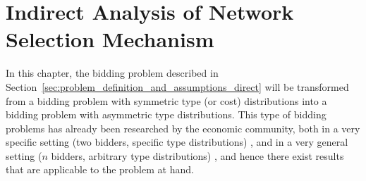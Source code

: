 \chapter{Indirect Analysis of Network Selection Mechanism}
\label{cha:indirect}

\minitoc
\vspace{10mm}

In this chapter, the bidding problem described in Section~\ref{sec:problem_definition_and_assumptions_direct} will be transformed from a bidding problem with symmetric type (or cost) distributions into a bidding problem with asymmetric type distributions. This type of bidding problems has already been researched by the economic community, both in a very specific setting (two bidders, specific type distributions) \cite{KaplanZamir2007,MaskinRiley2000}, and in a very general setting ($n$ bidders, arbitrary type distributions) \cite{Lebrun1999,Lebrun2006}, and hence there exist results that are applicable to the problem at hand.

